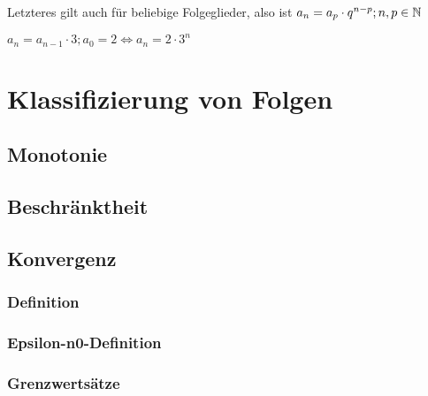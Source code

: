 \begin{Bemerkung}
Letzteres gilt auch für beliebige Folgeglieder, also ist $a_{n}=a_{p}\cdot q^{n-p};n,p\in\mathbb{N}$
\end{Bemerkung}

\begin{Beispiel}
$a_{n}=a_{n-1}\cdot3;a_{0}=2\Leftrightarrow a_{n}=2\cdot3^n$
\end{Beispiel}

		\section{Klassifizierung von Folgen}


	\subsection{Monotonie}

	\subsection{Beschränktheit}

	\subsection{Konvergenz}

\subsubsection{Definition}
\subsubsection{Epsilon-n0-Definition}
\subsubsection{Grenzwertsätze}



